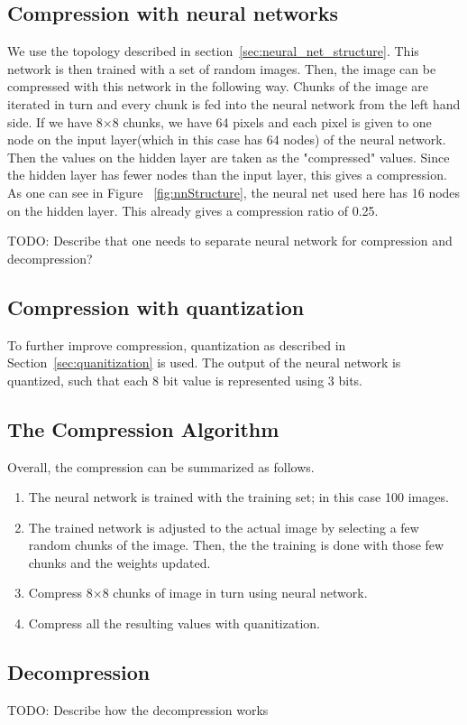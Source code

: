 \subsection{Compression with neural networks}
We use the topology described in section~\ref{sec:neural_net_structure}. This network is then trained with a set of random images. Then, the image can be compressed with this network in the following way. Chunks of the image are iterated in turn and every chunk is fed into the neural network from the left hand side. If we have 8$\times$8 chunks, we have 64 pixels and each pixel is given to one node on the input layer(which in this case has 64 nodes) of the neural network. Then the values on the hidden layer are taken as the "compressed" values. Since the hidden layer has fewer nodes than the input layer, this gives a compression. As one can see in Figure ~\ref{fig:nnStructure}, the neural net used here has 16 nodes on the hidden layer. This already gives a compression ratio of 0.25. 

TODO: Describe that one needs to separate neural network for compression and decompression?

\subsection{Compression with quantization}
To further improve compression, quantization as described in Section~\ref{sec:quanitization} is used. The output of the neural network is quantized, such that each 8 bit value is represented using 3 bits.  

\subsection{The Compression Algorithm}
\label{sec:compAlg}

Overall, the compression can be summarized as follows.

\begin{enumerate}
\item The neural network is trained with the training set; in this case 100 images.
\item The trained network is adjusted to the actual image by selecting a few random chunks of the image. Then, the the training is done with those few chunks and the weights updated. 
\item Compress 8$\times$8 chunks of image in turn using neural network.
\item Compress all the resulting values with quanitization.

\end{enumerate}

\subsection{Decompression}
\label{sec:decompAlg}
TODO: Describe how the decompression works
